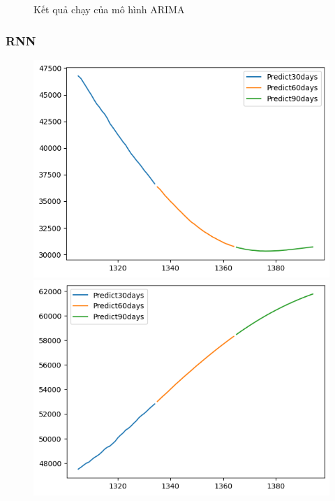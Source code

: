 \begin{figure}[H]
\begin{minipage}{0.15\textwidth}
    \end{minipage}
    \hfill
    
    \caption{Kết quả chạy của mô hình ARIMA}
    \label{fig:arima_predicted}
\end{figure}




\subsubsection{RNN}
\begin{figure}[H]
    \centering
    \begin{minipage}{0.15\textwidth}
    \centering
    \includegraphics[width=1\textwidth]{resources/chapter-5/newdata1/predicted/BIDV_ RNN_7-3_30days.png}
    \end{minipage}
    \hfill
    \begin{minipage}{0.15\textwidth}
    \centering
    \includegraphics[width=1\textwidth]{resources/chapter-5/newdata1/predicted/BIDV_ RNN_8-2_30days.png}

\end{minipage}
\end{figure}
